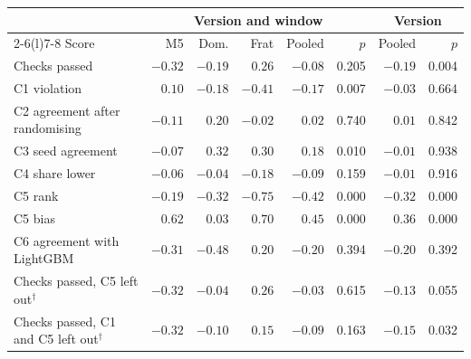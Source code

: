 \begin{tabular}{@{}lrrrrrrr@{}}
\toprule
 & \multicolumn{5}{c}{Version and window} & \multicolumn{2}{c}{Version} \\
\cmidrule(lr){2-6}\cmidrule(l){7-8}
Score & M5 & Dom. & Frat & Pooled & $p$ & Pooled & $p$ \\
\midrule
Checks passed & $-0.32$ & $-0.19$ & $0.26$ & $-0.08$ & 0.205 & $-0.19$ & 0.004 \\
C1 violation & $0.10$ & $-0.18$ & $-0.41$ & $-0.17$ & 0.007 & $-0.03$ & 0.664 \\
C2 agreement after randomising & $-0.11$ & $0.20$ & $-0.02$ & $0.02$ & 0.740 & $0.01$ & 0.842 \\
C3 seed agreement & $-0.07$ & $0.32$ & $0.30$ & $0.18$ & 0.010 & $-0.01$ & 0.938 \\
C4 share lower & $-0.06$ & $-0.04$ & $-0.18$ & $-0.09$ & 0.159 & $-0.01$ & 0.916 \\
C5 rank & $-0.19$ & $-0.32$ & $-0.75$ & $-0.42$ & 0.000 & $-0.32$ & 0.000 \\
C5 bias & $0.62$ & $0.03$ & $0.70$ & $0.45$ & 0.000 & $0.36$ & 0.000 \\
C6 agreement with LightGBM & $-0.31$ & $-0.48$ & $0.20$ & $-0.20$ & 0.394 & $-0.20$ & 0.392 \\
Checks passed, C5 left out$^\dagger$ & $-0.32$ & $-0.04$ & $0.26$ & $-0.03$ & 0.615 & $-0.13$ & 0.055 \\
Checks passed, C1 and C5 left out$^\dagger$ & $-0.32$ & $-0.10$ & $0.15$ & $-0.09$ & 0.163 & $-0.15$ & 0.032 \\
\bottomrule
\end{tabular}
